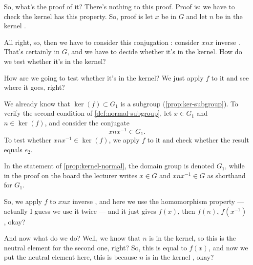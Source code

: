 \begin{proofWrapper}

\begin{speech}[00:48:26 - 00:48:59]
So, what's the proof of it? There's nothing to this proof. Proof is: we have to check the kernel has this property. So, proof is let $x$ be in $G$ and let $n$ be in the kernel .

All right, so, then we have to consider this conjugation : consider $x n x$ inverse . That's certainly in $G$, and we have to decide whether it's in the kernel. How do we test whether it's in the kernel?

How are we going to test whether it's in the kernel? We just apply $f$ to it and see where it goes, right?
\end{speech}

\begin{content}
We already know that $\ker(f) \subset G_1$ is a subgroup (\cref{prop:ker-subgroup}). To verify the second condition of \cref{def:normal-subgroup}, let $x \in G_1$ and $n \in \ker(f)$, and consider the conjugate
\[
x n x^{-1} \in G_1.
\]
To test whether $x n x^{-1} \in \ker(f)$, we apply $f$ to it and check whether the result equals $e_2$.
\end{content}

\begin{aiNote}
In the statement of \cref{prop:kernel-normal}, the domain group is denoted $G_1$, while in the proof on the board the lecturer writes $x \in G$ and $x n x^{-1} \in G$ as shorthand for $G_1$.
\end{aiNote}

\begin{speech}[00:48:59 - 00:50:37]
So, we apply $f$ to $x n x$ inverse , and here we use the homomorphism property --- actually I guess we use it twice --- and it just gives $f(x)$, then $f(n)$, $f(x^{-1})$ , okay?

And now what do we do? Well, we know that $n$ is in the kernel, so this  is the neutral element for the second one, right? So, this is equal to $f(x)$, and now we put the neutral element here, this is because $n$ is in the kernel , okay?


\end{speech}
\end{proofWrapper}
